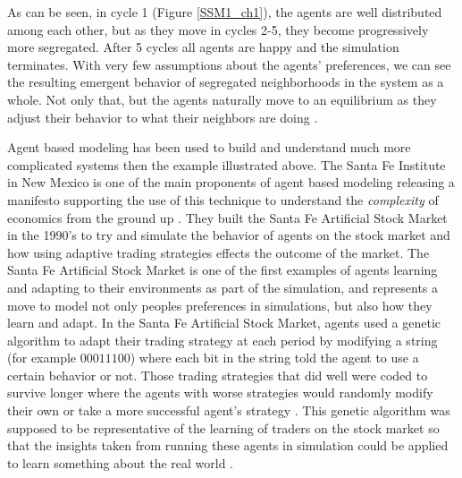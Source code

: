 \documentclass[12pt,twoside]{reedthesis}
\begin{document}
As can be seen, in cycle 1 (Figure \ref{SSM1_ch1}), the agents are well distributed among each other, but as they move in cycles 2-5, they become progressively more segregated. After 5 cycles all agents are happy and the simulation terminates. With very few assumptions about the agents' preferences, we can see the resulting emergent behavior of segregated neighborhoods in the system as a whole. Not only that, but the agents naturally move to an equilibrium as they adjust their behavior to what their neighbors are doing \citep{Sargent2019}. 

Agent based modeling has been used to build and understand much more complicated systems then the example illustrated above. The Santa Fe Institute in New Mexico is one of the main proponents of agent based modeling releasing a manifesto supporting the use of this technique to understand the {\em complexity} of economics from the ground up \citep{Backhouse2016}. They built the Santa Fe Artificial Stock Market in the 1990's to try and simulate the behavior of agents on the stock market and how using adaptive trading strategies effects the outcome of the market. The Santa Fe Artificial Stock Market is one of the first examples of agents learning and adapting to their environments as part of the simulation, and represents a move to model not only peoples preferences in simulations, but also how they learn and adapt\citep{LeBaron2002}. In the Santa Fe Artificial Stock Market, agents used a genetic algorithm to adapt their trading strategy at each period by modifying a string (for example $00011100$) where each bit in the string told the agent to use a certain behavior or not. Those trading strategies that did well were coded to survive longer where the agents with worse strategies would randomly modify their own or take a more successful agent's strategy \cite{Joshi1998}. This genetic algorithm was supposed to be representative of the learning of traders on the stock market so that the insights taken from running these agents in simulation could be applied to learn something about the real world \citep{Arthur1992}. 
\end{document}
